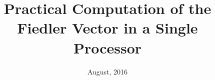 \documentclass[unknownkeysallowed]{beamer}
\title{Practical Computation of the Fiedler Vector in a Single Processor}
\date{August, 2016}
\begin{document}
	\begin{frame}[plain]
	  \titlepage
	\end{frame}
  
  
  
  
  
  
  
  
  
  
  
    
\end{document}
